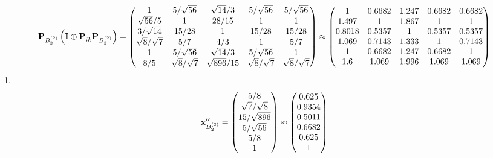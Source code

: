 \documentclass[10pt,a4paper]{article}
\begin{document}
	\[
		\bold{P}_{B_2^{(2)}}\left(\bold{I} \oplus \bold{P}_{lk}^{-}\bold{P}_{B_2^{(2)}}\right) = 
		\begin{pmatrix}
			{1}{} & {{5}} / {\sqrt{56}} & {\sqrt{14}} / {{3}} & {{5}} / {\sqrt{56}} & {{5}} / {\sqrt{56}} \\
			{\sqrt{56}} / {{5}} & {1}{} & {{28}} / {{15}} & {1}{} & {1}{} \\
			{{3}} / {\sqrt{14}} & {{15}} / {{28}} & {1}{} & {{15}} / {{28}} & {{15}} / {{28}} \\
			{\sqrt{8}} / {\sqrt{7}} & {{5}} / {{7}} & {{4}} / {{3}} & {1}{} & {{5}} / {{7}} \\
			{1}{} & {{5}} / {\sqrt{56}} & {\sqrt{14}} / {{3}} & {{5}} / {\sqrt{56}} & {1}{} \\
			{{8}} / {{5}} & {\sqrt{8}} / {\sqrt{7}} & {\sqrt{896}} / {{15}} & {\sqrt{8}} / {\sqrt{7}} & {\sqrt{8}} / {\sqrt{7}} \\
		\end{pmatrix}
		\approx
		\begin{pmatrix}
			1        & 0.6682   & 1.247    & 0.6682   & 0.6682   \\
			1.497    & 1        & 1.867    & 1        & 1        \\
			0.8018   & 0.5357   & 1        & 0.5357   & 0.5357   \\
			1.069    & 0.7143   & 1.333    & 1        & 0.7143   \\
			1        & 0.6682   & 1.247    & 0.6682   & 1        \\
			1.6      & 1.069    & 1.996    & 1.069    & 1.069    \\
		\end{pmatrix}
	\]
	1.
	\[
		\bold{x}''_{B_2^{(2)}} = 
		\begin{pmatrix}
			{{5}} / {{8}} \\
			{\sqrt{7}} / {\sqrt{8}} \\
			{{15}} / {\sqrt{896}} \\
			{{5}} / {\sqrt{56}} \\
			{{5}} / {{8}} \\
			{1}{} \\
		\end{pmatrix}
		\approx
		\begin{pmatrix}
			0.625    \\
			0.9354   \\
			0.5011   \\
			0.6682   \\
			0.625    \\
			1        \\
		\end{pmatrix}
	\]
\end{document}
